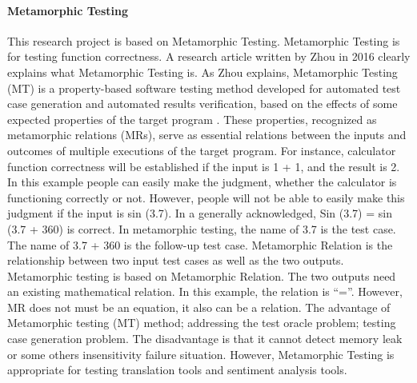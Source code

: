 \documentclass[conference]{IEEEtran}
\begin{document}
\paragraph{Metamorphic Testing}
This research project is based on Metamorphic Testing.
Metamorphic Testing is for testing function correctness.
A research article written by Zhou in 2016 clearly explains what Metamorphic
Testing is.
As Zhou explains, Metamorphic Testing (MT) is a property-based software testing
method developed for automated test case generation and automated results
verification, based on the effects of some expected properties of the target
program \cite{zhou2016metamorphic}.
These properties, recognized as metamorphic relations (MRs), serve as essential
relations between the inputs and outcomes of multiple executions of the target
program.
For instance, calculator function correctness will be established if the input is 1 + 1,
and the result is 2. In this example people can easily make the judgment,
whether the calculator is functioning correctly or not.
However, people will not be able to easily make this judgment if the input is sin (3.7).
In a generally acknowledged, Sin (3.7) = sin (3.7 + 360) is correct.
In metamorphic testing, the name of 3.7 is the test case. The name of 3.7 + 360
is the follow-up test case.
Metamorphic Relation is the relationship between two input test cases as well as
the two outputs.
Metamorphic testing is based on Metamorphic Relation.
The two outputs need an existing mathematical relation.
In this example, the relation is “=”. However, MR does not must be an equation,
it also can be a relation.
The advantage of Metamorphic testing (MT) method; addressing the test oracle
problem; testing case generation problem.
The disadvantage is that it cannot detect memory leak or some others insensitivity
failure situation.
However, Metamorphic Testing is appropriate for testing translation tools and
sentiment analysis tools.
\end{document}
